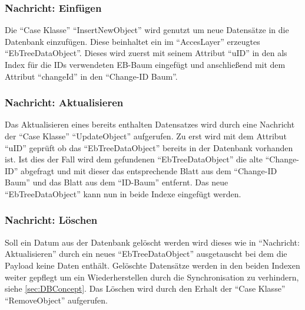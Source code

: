 \documentclass[a4paper,11pt,oneside,%
headsepline,												%
footsepline,												%
bibtotocnumbered									%
]{scrreprt}
\begin{document}
\subsubsection{Nachricht: Einfügen}
Die \enquote{Case Klasse} \enquote{InsertNewObject} wird genutzt um neue Datensätze in die Datenbank einzufügen. Diese beinhaltet ein im \enquote{AccesLayer} erzeugtes \enquote{EbTreeDataObject}. Dieses wird zuerst mit seinem Attribut \enquote{uID} in den als Index für die \ac{ID}s verwendeten \ac{EB-Baum} eingefügt und anschließend mit dem Attribut \enquote{changeId} in den \enquote{Change-ID Baum}.
\subsubsection{Nachricht: Aktualisieren}
Das Aktualisieren eines bereits enthalten Datensatzes wird durch eine Nachricht der \enquote{Case Klasse} \enquote{UpdateObject} aufgerufen. Zu erst wird mit dem Attribut \enquote{uID} geprüft ob das \enquote{EbTreeDataObject} bereits in der Datenbank vorhanden ist. Ist dies der Fall wird dem gefundenen \enquote{EbTreeDataObject} die alte \enquote{Change-ID} abgefragt und mit dieser das entsprechende Blatt aus dem \enquote{Change-ID Baum} und das Blatt aus dem \enquote{ID-Baum} entfernt. Das neue \enquote{EbTreeDataObject} kann nun in beide Indexe eingefügt werden.
\subsubsection{Nachricht: Löschen}
Soll ein Datum aus der Datenbank gelöscht werden wird dieses wie in \enquote{Nachricht: Aktualisieren} durch ein neues \enquote{EbTreeDataObject} ausgetauscht bei dem die Payload keine Daten enthält. Gelöschte Datensätze werden in den beiden Indexen weiter gepflegt um ein Wiederherstellen durch die Synchronisation zu verhindern, siehe \autoref{sec:DBConcept}. Das Löschen wird durch den Erhalt der \enquote{Case Klasse} \enquote{RemoveObject} aufgerufen.
\end{document}
